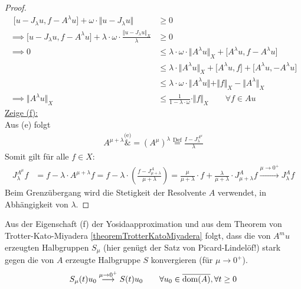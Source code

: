 \begin{proof}
\begin{align*}
		\hspace{5pt}\big[u-J_\lambda u,f-A^\lambda u\big]+\omega\cdot\big\Vert u-J_\lambda u\big\Vert&\geq0\\
		\implies
		\big[u-J_\lambda u,f-A^\lambda u\big]+\lambda\cdot\omega\cdot\frac{\big\Vert u-J_\lambda u\big\Vert_X}{\lambda}&\geq0\\
		\implies
		0&\leq\lambda\cdot\omega\cdot\big\Vert A^\lambda u\big\Vert_X+\big[A^\lambda u,f-A^\lambda u\big]\\
		&\leq\lambda\cdot\big\Vert A^\lambda u\big\Vert_X+\big[A^\lambda u,f\big]+\big[A^\lambda u,-A^\lambda u\big]\\
		&\leq\lambda\cdot\omega\cdot\big\Vert A^\lambda u\big\Vert+\Vert f\Vert_X-\big\Vert A^\lambda\big\Vert_X\\
		\implies\big\Vert A^\lambda u\big\Vert_X
		&\leq\frac{1}{1-\lambda\cdot\omega}\cdot\Vert f\Vert_X
		\qquad\forall f\in Au
	\end{align*}
	\underline{Zeige (f):}\\
	Aus (e) folgt
	\begin{align*}
		A^{\mu+\lambda}
		\overset{\text{(e)}}&=
		\left(A^\mu\right)^\lambda
		\overset{\text{Def}}=
		\frac{I-J_\lambda^{A^\mu}}{\lambda}
	\end{align*}
	Somit gilt für alle $f\in X$:
	\begin{align*}
		J_\lambda^{A^\mu} f
		&= f-\lambda\cdot A^{\mu+\lambda} f
		=f-\lambda\cdot\left(\frac{f-J_{\mu+\lambda}^A}{\mu+\lambda}\right)
		=\frac{\mu}{\mu+\lambda}\cdot f+\frac{\lambda}{\mu+\lambda}\cdot J_{\mu+\lambda}^A f
		\overset{\mu\to0^+}{\longrightarrow}J_\lambda^A f
	\end{align*}
	Beim Grenzübergang wird die Stetigkeit der Resolvente $A$ verwendet, in Abhängigkeit von $\lambda$.
\end{proof}

\begin{bemerkung}
	Aus der Eigenschaft (f) der Yosidaapproximation und aus dem Theorem von Trotter-Kato-Miyadera \ref{theoremTrotterKatoMiyadera} folgt, dass die von $A^mu$ erzeugten Halbgruppen $S_\mu$ 
	(hier genügt der Satz von Picard-Lindelöf!)
	stark gegen die von $A$ erzeugte Halbgruppe $S$ konvergieren
	(für $\mu\to0^+$).
	\begin{align*}
		S_\mu(t)u_0\overset{\mu\to0^+}{\longrightarrow} S(t)u_0
		\qquad\forall u_0\in\overline{\operatorname{dom}(A)},\forall t\geq0
	\end{align*}
\end{bemerkung}

